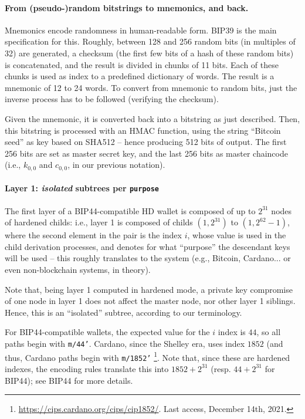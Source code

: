 \paragraph{From (pseudo-)random bitstrings to mnemonics, and back.} %
Mnemonics encode randomness in human-readable form. BIP39 is the main
specification for this. Roughly, between 128 and 256 random bits (in multiples
of 32) are generated, a checksum (the first few bits of a hash of these random
bits) is concatenated, and the result is divided in chunks of 11 bits. Each of
these chunks is used as index to a predefined dictionary of words. The result
is a mnemonic of 12 to 24 words. To convert from mnemonic to random bits, just
the inverse process has to be followed (verifying the checksum).

Given the mnemonic, it is converted back into a bitstring as just described.
Then, this bitstring is processed with an HMAC function, using the string
``Bitcoin seed'' as key based on SHA512 -- hence producing 512 bits of
output. The first 256 bits are set as master secret key, and the last 256 bits
as master chaincode (i.e., $k_{0,0}$ and $c_{0,0}$, in our previous notation).

\paragraph{Layer 1: \emph{isolated} subtrees per \texttt{purpose}} %
The first layer of a BIP44-compatible HD wallet is composed of up to $2^{31}$
nodes of hardened childs: i.e., layer 1 is composed of childs $(1,2^{31})$
to $(1,2^{62}-1)$, where the second element in the pair is the index $i$,
whose value is used in the child derivation processes, and denotes for what
``purpose'' the descendant keys will be used -- this roughly translates to the
system (e.g., Bitcoin, Cardano... or even non-blockchain systems, in theory).

Note that, being layer 1 computed in hardened mode, a private key compromise
of one node in layer 1 does not affect the master node, nor other layer 1
siblings. Hence, this is an ``isolated'' subtree, according to our terminology.

For BIP44-compatible wallets, the expected value for the $i$ index is $44$, so
all paths begin with \texttt{m/44'}. Cardano, since the Shelley era, uses index
$1852$ (and thus, Cardano paths begin with \texttt{m/1852'}%
\footnote{\url{https://cips.cardano.org/cips/cip1852/}. Last access, December
  14th, 2021.}. Note that, since these are hardened indexes, the encoding
rules translate this into $1852+2^{31}$ (resp. $44+2^{31}$ for BIP44); see
BIP44 for more details.


